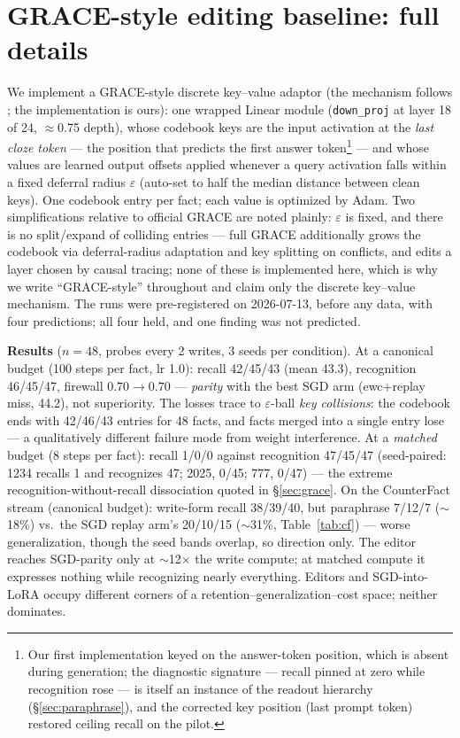 \documentclass[11pt]{article}
\begin{document}
\section{GRACE-style editing baseline: full details}\label{app:grace}

We implement a GRACE-style discrete key--value adaptor (the mechanism follows
\citet{hartvigsen2022grace}; the implementation is ours): one wrapped Linear module
(\texttt{down\_proj} at layer 18 of 24, $\approx$0.75 depth), whose codebook keys are the input
activation at the \emph{last cloze token} --- the position that predicts the first answer
token\footnote{Our first implementation keyed on the answer-token position, which is absent
during generation; the diagnostic signature --- recall pinned at zero while recognition rose ---
is itself an instance of the readout hierarchy (\S\ref{sec:paraphrase}), and the corrected key
position (last prompt token) restored ceiling recall on the pilot.} --- and whose values are
learned output offsets applied whenever a query activation falls within a fixed deferral radius
$\varepsilon$ (auto-set to half the median distance between clean keys). One codebook entry per
fact; each value is optimized by Adam. Two simplifications relative to official GRACE are noted
plainly: $\varepsilon$ is fixed, and there is no split/expand of colliding entries --- full
GRACE additionally grows the codebook via deferral-radius adaptation and key splitting on
conflicts, and edits a layer chosen by causal tracing; none of these is implemented here, which is
why we write ``GRACE-style'' throughout and claim only the discrete key--value mechanism. The runs
were pre-registered on 2026-07-13, before any data, with four predictions; all four held, and
one finding was not predicted.

\textbf{Results} ($n{=}48$, probes every 2 writes, 3 seeds per condition). At a canonical budget
(100 steps per fact, lr 1.0): recall 42/45/43 (mean 43.3), recognition 46/45/47, firewall
$0.70\to0.70$ --- \emph{parity} with the best SGD arm (ewc+replay miss, 44.2), not superiority.
The losses trace to $\varepsilon$-ball \emph{key collisions}: the codebook ends with 42/46/43
entries for 48 facts, and facts merged into a single entry lose --- a qualitatively different
failure mode from weight interference. At a \emph{matched} budget (8 steps per fact): recall
1/0/0 against recognition 47/45/47 (seed-paired: 1234 recalls 1 and recognizes 47; 2025, 0/45;
777, 0/47) --- the extreme recognition-without-recall dissociation
quoted in \S\ref{sec:grace}. On the CounterFact stream (canonical budget): write-form recall
38/39/40, but paraphrase 7/12/7 ($\sim$18\%) vs.\ the SGD replay arm's 20/10/15 ($\sim$31\%,
Table~\ref{tab:cf}) --- worse generalization, though the seed bands overlap, so direction only.
The editor reaches SGD-parity only at $\sim$12$\times$ the write compute; at matched compute it
expresses nothing while recognizing nearly everything. Editors and SGD-into-LoRA occupy
different corners of a retention--generalization--cost space; neither dominates.
\end{document}
